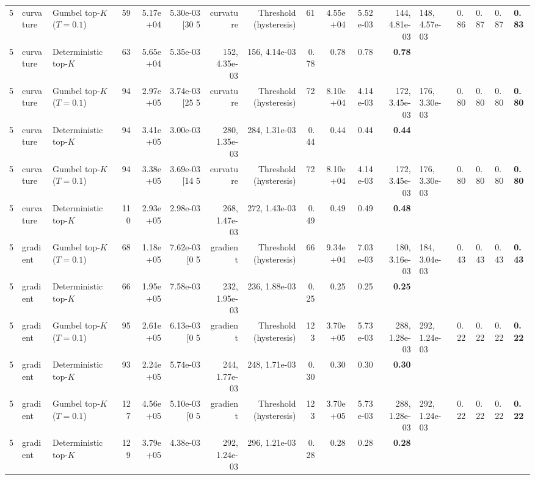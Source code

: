 \begin{tabular}{rllrrrrrrrrr}
5 & curvature & Gumbel top-$K$ ($T=0.1$) & 59 & 5.17e+04 & 5.30e-03 [30%
5 & curvature & Threshold (hysteresis) & 61 & 4.55e+04 & 5.52e-03 & 144, 4.81e-03 & 148, 4.57e-03 & 0.86 & 0.87 & 0.87 & \textbf{0.83} \\
5 & curvature & Deterministic top-$K$ & 63 & 5.65e+04 & 5.35e-03 & 152, 4.35e-03 & 156, 4.14e-03 & 0.78 & 0.78 & 0.78 & \textbf{0.78} \\
5 & curvature & Gumbel top-$K$ ($T=0.1$) & 94 & 2.97e+05 & 3.74e-03 [25%
5 & curvature & Threshold (hysteresis) & 72 & 8.10e+04 & 4.14e-03 & 172, 3.45e-03 & 176, 3.30e-03 & 0.80 & 0.80 & 0.80 & \textbf{0.80} \\
5 & curvature & Deterministic top-$K$ & 94 & 3.41e+05 & 3.00e-03 & 280, 1.35e-03 & 284, 1.31e-03 & 0.44 & 0.44 & 0.44 & \textbf{0.44} \\
5 & curvature & Gumbel top-$K$ ($T=0.1$) & 94 & 3.38e+05 & 3.69e-03 [14%
5 & curvature & Threshold (hysteresis) & 72 & 8.10e+04 & 4.14e-03 & 172, 3.45e-03 & 176, 3.30e-03 & 0.80 & 0.80 & 0.80 & \textbf{0.80} \\
5 & curvature & Deterministic top-$K$ & 110 & 2.93e+05 & 2.98e-03 & 268, 1.47e-03 & 272, 1.43e-03 & 0.49 & 0.49 & 0.49 & \textbf{0.48} \\
5 & gradient & Gumbel top-$K$ ($T=0.1$) & 68 & 1.18e+05 & 7.62e-03 [0%
5 & gradient & Threshold (hysteresis) & 66 & 9.34e+04 & 7.03e-03 & 180, 3.16e-03 & 184, 3.04e-03 & 0.43 & 0.43 & 0.43 & \textbf{0.43} \\
5 & gradient & Deterministic top-$K$ & 66 & 1.95e+05 & 7.58e-03 & 232, 1.95e-03 & 236, 1.88e-03 & 0.25 & 0.25 & 0.25 & \textbf{0.25} \\
5 & gradient & Gumbel top-$K$ ($T=0.1$) & 95 & 2.61e+05 & 6.13e-03 [0%
5 & gradient & Threshold (hysteresis) & 123 & 3.70e+05 & 5.73e-03 & 288, 1.28e-03 & 292, 1.24e-03 & 0.22 & 0.22 & 0.22 & \textbf{0.22} \\
5 & gradient & Deterministic top-$K$ & 93 & 2.24e+05 & 5.74e-03 & 244, 1.77e-03 & 248, 1.71e-03 & 0.30 & 0.30 & 0.30 & \textbf{0.30} \\
5 & gradient & Gumbel top-$K$ ($T=0.1$) & 127 & 4.56e+05 & 5.10e-03 [0%
5 & gradient & Threshold (hysteresis) & 123 & 3.70e+05 & 5.73e-03 & 288, 1.28e-03 & 292, 1.24e-03 & 0.22 & 0.22 & 0.22 & \textbf{0.22} \\
5 & gradient & Deterministic top-$K$ & 129 & 3.79e+05 & 4.38e-03 & 292, 1.24e-03 & 296, 1.21e-03 & 0.28 & 0.28 & 0.28 & \textbf{0.28} \\
\bottomrule
\end{tabular}
